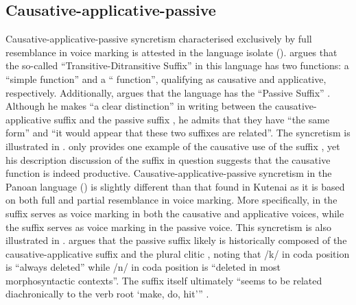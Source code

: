 \subsection{Causative-applicative-passive} \label{sec:complex-syncretism:caus-appl-pass}
Causative-applicative-passive syncretism characterised exclusively by full resemblance in voice marking is attested in the language isolate  (). \cite[300]{morgan:1991} argues that the so-called “Transitive-Ditransitive Suffix”  in this language has two functions: a “simple  function” and a “ function”, qualifying as causative and applicative, respectively. Additionally, \cite[301]{morgan:1991} argues that the language has the “Passive Suffix” . Although he makes “a clear distinction” in writing between the causative-applicative suffix  and the passive suffix , he admits that they have “the same form” and “it would appear that these two suffixes are related”. The syncretism is illustrated in . \citeauthor{morgan:1991} only provides one example of the causative use of the suffix , yet his description discussion of the suffix in question suggests that the causative function is indeed productive. Causative-applicative-passive syncretism in the Panoan language  () is slightly different than that found in Kutenai as it is based on both full and partial resemblance in voice marking. More specifically, in  the suffix  serves as voice marking in both the causative and applicative voices, while the suffix  serves as voice marking in the passive voice. This syncretism is also illustrated in . \cite[644]{tallman:2018} argues that the passive suffix likely is historically composed of the causative-applicative suffix  and the plural clitic , noting that /k/ in coda position is “always deleted” while /n/ in coda position is “deleted in most morphosyntactic contexts”. The suffix  itself ultimately “seems to be related diachronically to the  verb root  ‘make, do, hit’” \citep[652]{tallman:2018}. 

